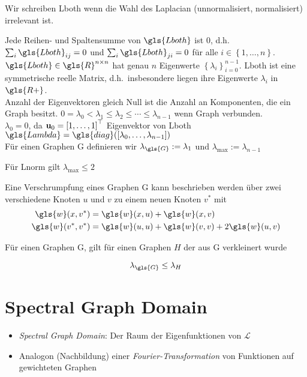 Wir schreiben \gls{Lboth} wenn die Wahl des Laplacian (unnormalisiert, normalisiert) irrelevant ist.

Jede Reihen- und Spaltensumme von $\gls{Lboth}$ ist $0$, d.h.\ $\sum_i \gls{Lboth}_{ij} = 0$ und $\sum_i \gls{Lboth}_{ji} = 0$ für alle $i \in \left\{1, \ldots, n\right\}$.
$\gls{Lboth} \in \gls{R}^{n \times n}$ hat genau $n$ Eigenwerte ${\left\{\lambda_i\right\}}_{i = 0}^{n-1}$.
\gls{Lboth} ist eine symmetrische reelle Matrix, d.h.\ insbesondere liegen ihre Eigenwerte $\lambda_i$ in $\gls{R+}$.\\
Anzahl der Eigenvektoren gleich Null ist die Anzahl an Komponenten, die ein Graph besitzt.
$0 = \lambda_0 < \lambda_1 \leq \lambda_2 \leq \cdots \leq \lambda_{n-1}$ wenn Graph verbunden.\\
$\lambda_0 = 0$, da $\ve{u}_0 = {\left[1, \ldots, 1\right]}^{\top}$ Eigenvektor von \gls{Lboth}\\
$\gls{Lambda} = \gls{diag}\left(\left[\lambda_0, \ldots, \lambda_{n-1}\right]\right)$\\
Für einen Graphen \gls{G} definieren wir $\lambda_{\gls{G}} := \lambda_1$ und $\lambda_{\max} := \lambda_{n-1}$

Für \gls{Lnorm} gilt $\lambda_{\max} \leq 2$

Eine Verschrumpfung eines Graphen \gls{G} kann beschrieben werden über zwei verschiedene Knoten $u$ und $v$ zu einem neuen Knoten $v^*$ mit
\begin{align}
  \gls{w}\left(x,v^*\right) &= \gls{w}\left(x, u\right) + \gls{w}\left(x, v\right)\\
  \gls{w}\left(v^*, v^*\right) &= \gls{w}\left(u, u\right) + \gls{w}\left(v, v\right) + 2\gls{w}\left(u,v\right)
\end{align}

Für einen Graphen \gls{G}, gilt für einen Graphen $H$ der aus \gls{G} verkleinert wurde

\begin{equation}
  \lambda_{\gls{G}} \leq \lambda_H
\end{equation}

\section{Spectral Graph Domain}

\begin{itemize}
  \item \emph{Spectral Graph Domain}: Der Raum der Eigenfunktionen von $\mathcal{L}$
  \item Analogon (Nachbildung) einer \emph{Fourier-Transformation} von Funktionen auf gewichteten Graphen
\end{itemize}

